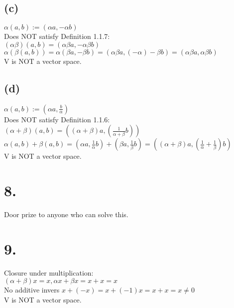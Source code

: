 \documentclass{article}
\begin{document}
\subsection*{(c)}
$\alpha(a,b) := (\alpha a,-\alpha b)$\\
Does NOT satisfy Definition 1.1.7:\\ 
$(\alpha\beta)(a,b) = (\alpha\beta a, -\alpha\beta b)$\\
$\alpha(\beta(a,b)) = \alpha(\beta a, -\beta b) = (\alpha\beta a, (-\alpha)-\beta b) = (\alpha\beta a, \alpha\beta b)$\\
V is NOT a vector space.
\subsection*{(d)}
$\alpha(a,b) := (\alpha a,\frac{b}{\alpha})$\\
Does NOT satisfy Definition 1.1.6:\\
$(\alpha + \beta)(a,b) = ((\alpha+\beta)a, (\frac{1}{\alpha+\beta}b))$\\
$\alpha(a,b) + \beta(a,b) = (\alpha a, \frac{1}{\alpha}b) +  (\beta a, \frac{1}{\beta}b) = ((\alpha+\beta)a, (\frac{1}{\alpha} + \frac{1}{\beta}) b)$\\
V is NOT a vector space.

\section*{8.}
Door prize to anyone who can solve this.
\section*{9.}
Closure under multiplication:\\
$(\alpha + \beta)x = x, \alpha x + \beta x = x + x = x$\\
No additive invers
$x + (-x) = x + (-1)x = x + x = x \ne 0$\\
V is NOT a vector space.
\end{document}
